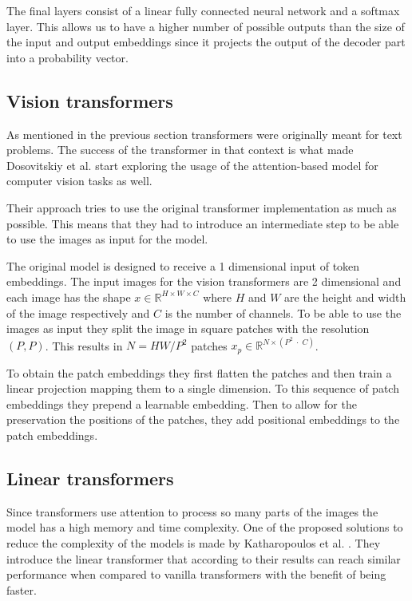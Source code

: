 The final layers consist of a linear fully connected neural network and a softmax layer. This allows us to have a higher number of possible outputs than the size of the input and output embeddings since it projects the output of the decoder part into a probability vector.

\subsection{Vision transformers}
\label{sec:prelim:transformers:vision}

As mentioned in the previous section transformers were originally meant for text problems. The success of the transformer in that context is what made Dosovitskiy et al. \cite{dosovitskiy_image_2021} start exploring the usage of the attention-based model for computer vision tasks as well.

Their approach tries to use the original transformer implementation as much as possible. This means that they had to introduce an intermediate step to be able to use the images as input for the model.

The original model is designed to receive a 1 dimensional input of token embeddings. The input images for the vision transformers are 2 dimensional and each image has the shape $x \in \mathbb{R}^{H \times W \times C}$ where $H$ and $W$ are the height and width of the image respectively and $C$ is the number of channels. To be able to use the images as input they split the image in square patches with the resolution $(P, P)$. This results in $N = HW/P^2$ patches $x_p \in \mathbb{R}^{N \times (P^2 \; \cdot \; C)}$.

To obtain the patch embeddings they first flatten the patches and then train a linear projection  mapping them to a single dimension. To this sequence of patch embeddings they prepend a learnable embedding. Then to allow for the preservation the positions of the patches, they add positional embeddings to the patch embeddings.

\subsection{Linear transformers}
\label{sec:prelim:transformers:linear}

Since transformers use attention to process so many parts of the images the model has a high memory and time complexity. One of the proposed solutions to reduce the complexity of the models is made by Katharopoulos et al. \cite{katharopoulos_transformers_2020}. They introduce the linear transformer that according to their results can reach similar performance when compared to vanilla transformers with the benefit of being faster. 


